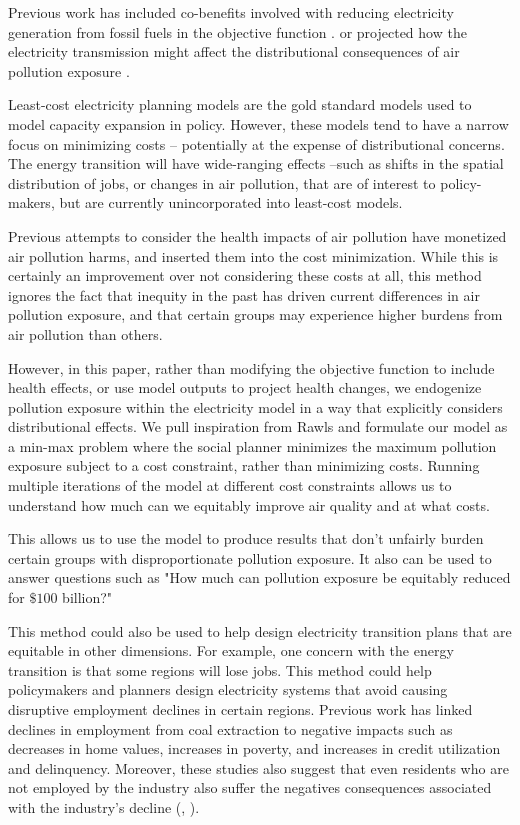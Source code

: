 \documentclass[a4paper]{article}
\theoremstyle{definition}
\theoremstyle{plain}
\begin{document}
Previous work has included co-benefits involved with reducing electricity generation from fossil fuels in the objective function \citet{Sergi2020OptimizingBenefits}.
or projected how the electricity transmission might affect the distributional consequences of air pollution exposure \citep{Goforth2022AirStrategies}. 

Least-cost electricity planning models are the gold standard models used to model capacity expansion in policy.  However, these models tend to have a narrow focus on minimizing costs -- potentially at the expense of distributional concerns.  The energy transition will have wide-ranging effects --such as shifts in the spatial distribution of jobs, or changes in air pollution, that are of interest to policy-makers, but are currently unincorporated into least-cost models.

Previous attempts to consider the health impacts of air pollution have monetized air pollution harms, and inserted them into the cost minimization.  While this is certainly an improvement over not considering these costs at all, this method ignores the fact that inequity in the past has driven current differences in air pollution exposure, and that certain groups may experience higher burdens from air pollution than others.

However, in this paper, rather than modifying the objective function to include health effects, or use model outputs to project health changes, we endogenize pollution exposure within the electricity model in a way that explicitly considers distributional effects.  We pull inspiration from Rawls and formulate our model as a min-max problem where the social planner minimizes the maximum pollution exposure subject to a cost constraint, rather than minimizing costs.  Running multiple iterations of the model at different cost constraints allows us to understand how much can we equitably improve air quality and at what costs.

This allows us to use the model to produce results that don't unfairly burden certain groups with disproportionate pollution exposure.  It also can be used to answer questions such as "How much can pollution exposure be equitably reduced for $\$100$ billion?" 

This method could also be used to help design electricity transition plans that are equitable in other dimensions.  For example, one concern with the energy transition is that some regions will lose jobs.  This method could help policymakers and planners design electricity systems that avoid causing disruptive employment declines in certain regions. Previous work has linked declines in employment from  coal extraction to negative impacts such as decreases in home values, increases in poverty, and increases in credit utilization and delinquency. Moreover, these studies also suggest that even residents who are not employed by the industry also suffer the negatives consequences associated with the industry's decline (\citet{Kraynak2023TheCountry}, \citet{Blonz2023TheFuels}). 
\end{document}
